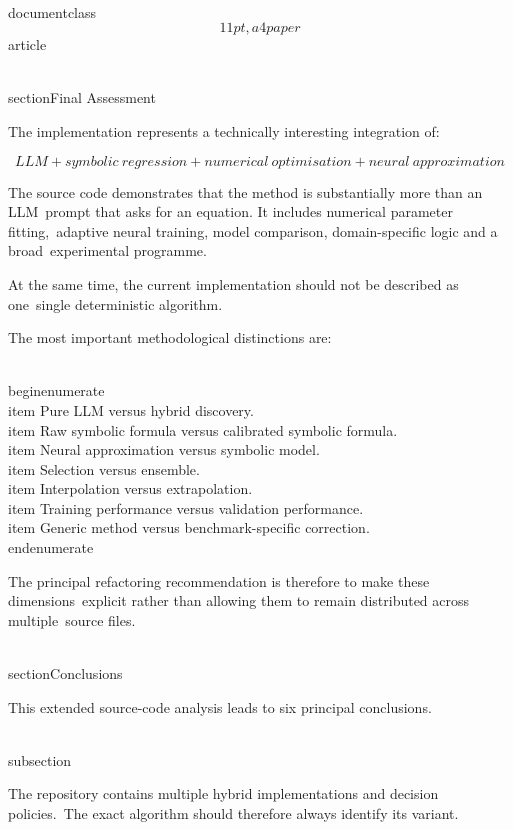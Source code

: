 \\documentclass\[11pt,a4paper\]{article}
\begin{document}
 \\section{Final Assessment}\

 The implementation represents a technically interesting integration of:

 $$
\boxed{
LLM
+
symbolic\ regression
+
numerical\ optimisation
+
neural\ approximation
}
$$

 The source code demonstrates that the method is substantially more than an LLM\
 prompt that asks for an equation. It includes numerical parameter fitting,\
 adaptive neural training, model comparison, domain-specific logic and a broad\
 experimental programme.

 At the same time, the current implementation should not be described as one\
 single deterministic algorithm.

 The most important methodological distinctions are:

 \\begin{enumerate}\
 \\item Pure LLM versus hybrid discovery.\
 \\item Raw symbolic formula versus calibrated symbolic formula.\
 \\item Neural approximation versus symbolic model.\
 \\item Selection versus ensemble.\
 \\item Interpolation versus extrapolation.\
 \\item Training performance versus validation performance.\
 \\item Generic method versus benchmark-specific correction.\
 \\end{enumerate}

 The principal refactoring recommendation is therefore to make these dimensions\
 explicit rather than allowing them to remain distributed across multiple\
 source files.

 \\section{Conclusions}\

 This extended source-code analysis leads to six principal conclusions.

 \\subsection{}

 The repository contains multiple hybrid implementations and decision policies.\
 The exact algorithm should therefore always identify its variant.
\end{document}
